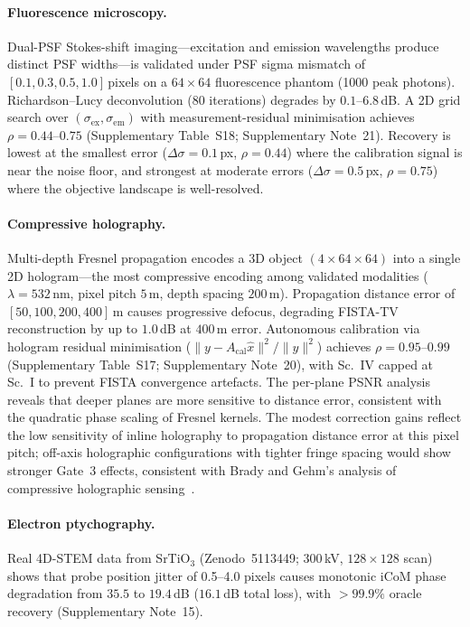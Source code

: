 \documentclass[11pt]{article}
\newcommand{\recoveryratio}{\rho}
\begin{document}
\paragraph{Fluorescence microscopy.}
Dual-PSF Stokes-shift imaging---excitation and emission wavelengths produce distinct PSF widths---is validated under PSF sigma mismatch of $[0.1, 0.3, 0.5, 1.0]$\,pixels on a $64 \times 64$ fluorescence phantom (1000 peak photons). Richardson--Lucy deconvolution (80 iterations) degrades by $0.1$--$6.8$\,dB. A 2D grid search over $(\sigma_{\mathrm{ex}}, \sigma_{\mathrm{em}})$ with measurement-residual minimisation achieves $\recoveryratio = 0.44$--$0.75$ (Supplementary Table~S18; Supplementary Note~21). Recovery is lowest at the smallest error ($\Delta\sigma = 0.1$\,px, $\rho = 0.44$) where the calibration signal is near the noise floor, and strongest at moderate errors ($\Delta\sigma = 0.5$\,px, $\rho = 0.75$) where the objective landscape is well-resolved.

\paragraph{Compressive holography.}
Multi-depth Fresnel propagation encodes a 3D object $(4 \times 64 \times 64)$ into a single 2D hologram---the most compressive encoding among validated modalities ($\lambda = 532$\,nm, pixel pitch $5$\,\textmu m, depth spacing $200$\,\textmu m). Propagation distance error of $[50, 100, 200, 400]$\,\textmu m causes progressive defocus, degrading FISTA-TV reconstruction by up to $1.0$\,dB at $400$\,\textmu m error. Autonomous calibration via hologram residual minimisation ($\|y - A_{\mathrm{cal}}\hat{x}\|^2 / \|y\|^2$) achieves $\recoveryratio = 0.95$--$0.99$ (Supplementary Table~S17; Supplementary Note~20), with Sc.~IV capped at Sc.~I to prevent FISTA convergence artefacts. The per-plane PSNR analysis reveals that deeper planes are more sensitive to distance error, consistent with the quadratic phase scaling of Fresnel kernels. The modest correction gains reflect the low sensitivity of inline holography to propagation distance error at this pixel pitch; off-axis holographic configurations with tighter fringe spacing would show stronger Gate~3 effects, consistent with Brady and Gehm's analysis of compressive holographic sensing~\cite{brady2009compressive}.

\paragraph{Electron ptychography.}
Real 4D-STEM data from SrTiO$_3$ (Zenodo~5113449; 300\,kV, $128 \times 128$ scan) shows that probe position jitter of 0.5--4.0 pixels causes monotonic iCoM phase degradation from $35.5$ to $19.4$\,dB ($16.1$\,dB total loss), with $>99.9\%$ oracle recovery (Supplementary Note~15).
\end{document}
